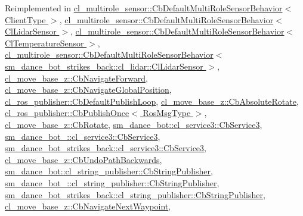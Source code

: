 Reimplemented in \hyperlink{classcl__multirole__sensor_1_1CbDefaultMultiRoleSensorBehavior_a5ac29f93cc91e23715f51ade94467cae}{cl\+\_\+multirole\+\_\+sensor\+::\+Cb\+Default\+Multi\+Role\+Sensor\+Behavior$<$ Client\+Type $>$}, \hyperlink{classcl__multirole__sensor_1_1CbDefaultMultiRoleSensorBehavior_a5ac29f93cc91e23715f51ade94467cae}{cl\+\_\+multirole\+\_\+sensor\+::\+Cb\+Default\+Multi\+Role\+Sensor\+Behavior$<$ Cl\+Lidar\+Sensor $>$}, \hyperlink{classcl__multirole__sensor_1_1CbDefaultMultiRoleSensorBehavior_a5ac29f93cc91e23715f51ade94467cae}{cl\+\_\+multirole\+\_\+sensor\+::\+Cb\+Default\+Multi\+Role\+Sensor\+Behavior$<$ Cl\+Temperature\+Sensor $>$}, \hyperlink{classcl__multirole__sensor_1_1CbDefaultMultiRoleSensorBehavior_a5ac29f93cc91e23715f51ade94467cae}{cl\+\_\+multirole\+\_\+sensor\+::\+Cb\+Default\+Multi\+Role\+Sensor\+Behavior$<$ sm\+\_\+dance\+\_\+bot\+\_\+strikes\+\_\+back\+::cl\+\_\+lidar\+::\+Cl\+Lidar\+Sensor $>$}, \hyperlink{classcl__move__base__z_1_1CbNavigateForward_af9a2e49071de287922c3f5963a079b95}{cl\+\_\+move\+\_\+base\+\_\+z\+::\+Cb\+Navigate\+Forward}, \hyperlink{classcl__move__base__z_1_1CbNavigateGlobalPosition_a66d8b0555ef2945bc108dcd5171be292}{cl\+\_\+move\+\_\+base\+\_\+z\+::\+Cb\+Navigate\+Global\+Position}, \hyperlink{classcl__ros__publisher_1_1CbDefaultPublishLoop_a6e6cfb477cbefc510ca7b55a061545e4}{cl\+\_\+ros\+\_\+publisher\+::\+Cb\+Default\+Publish\+Loop}, \hyperlink{classcl__move__base__z_1_1CbAbsoluteRotate_a10418ea360809fa649d295716b152b2b}{cl\+\_\+move\+\_\+base\+\_\+z\+::\+Cb\+Absolute\+Rotate}, \hyperlink{classcl__ros__publisher_1_1CbPublishOnce_afaed71bc2694ec1837278d5f931a76e1}{cl\+\_\+ros\+\_\+publisher\+::\+Cb\+Publish\+Once$<$ Ros\+Msg\+Type $>$}, \hyperlink{classcl__move__base__z_1_1CbRotate_a316ee51ecfd3f10fd1edae0d7d3b26c0}{cl\+\_\+move\+\_\+base\+\_\+z\+::\+Cb\+Rotate}, \hyperlink{classsm__dance__bot_1_1cl__service3_1_1CbService3_ae9e3796b507ad96cc0890fec0f64a4b7}{sm\+\_\+dance\+\_\+bot\+::cl\+\_\+service3\+::\+Cb\+Service3}, \hyperlink{classsm__dance__bot__2_1_1cl__service3_1_1CbService3_a179e43cc240f53f9c49c67094e41d75f}{sm\+\_\+dance\+\_\+bot\+\_\+::cl\+\_\+service3\+::\+Cb\+Service3}, \hyperlink{classsm__dance__bot__strikes__back_1_1cl__service3_1_1CbService3_a09a2fda38973e1e3915b63a47ca67ed1}{sm\+\_\+dance\+\_\+bot\+\_\+strikes\+\_\+back\+::cl\+\_\+service3\+::\+Cb\+Service3}, \hyperlink{classcl__move__base__z_1_1CbUndoPathBackwards_a32e680530375b62c7053bf173f6b2b1b}{cl\+\_\+move\+\_\+base\+\_\+z\+::\+Cb\+Undo\+Path\+Backwards}, \hyperlink{classsm__dance__bot_1_1cl__string__publisher_1_1CbStringPublisher_a7aa533578e820ee90d92d15b85d42e9b}{sm\+\_\+dance\+\_\+bot\+::cl\+\_\+string\+\_\+publisher\+::\+Cb\+String\+Publisher}, \hyperlink{classsm__dance__bot__2_1_1cl__string__publisher_1_1CbStringPublisher_abc3c362ea55110f8d340e5cb4d901892}{sm\+\_\+dance\+\_\+bot\+\_\+::cl\+\_\+string\+\_\+publisher\+::\+Cb\+String\+Publisher}, \hyperlink{classsm__dance__bot__strikes__back_1_1cl__string__publisher_1_1CbStringPublisher_a2c3963143fe180a5e5f939362857d2e0}{sm\+\_\+dance\+\_\+bot\+\_\+strikes\+\_\+back\+::cl\+\_\+string\+\_\+publisher\+::\+Cb\+String\+Publisher}, \hyperlink{classcl__move__base__z_1_1CbNavigateNextWaypoint_a04913ef24344363669c1916b5df28493}{cl\+\_\+move\+\_\+base\+\_\+z\+::\+Cb\+Navigate\+Next\+Waypoint}, 